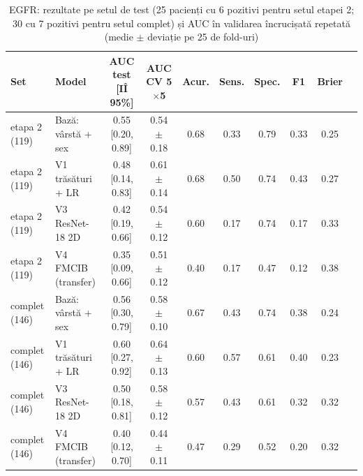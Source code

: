 \begin{table}[htbp]
\centering
\scriptsize
\setlength{\tabcolsep}{3pt}
\begin{tabular}{llcccccccc}
\toprule
\textbf{Set} & \textbf{Model} & \textbf{AUC test [IÎ 95\%]} & \textbf{AUC CV 5$\times$5} & \textbf{Acur.} & \textbf{Sens.} & \textbf{Spec.} & \textbf{F1} & \textbf{Brier} \\
\midrule
etapa 2 (119) & Bază: vârstă + sex & 0.55 [0.20, 0.89] & 0.54 $\pm$ 0.18 & 0.68 & 0.33 & 0.79 & 0.33 & 0.25 \\
etapa 2 (119) & V1 trăsături + LR & 0.48 [0.14, 0.83] & 0.61 $\pm$ 0.14 & 0.68 & 0.50 & 0.74 & 0.43 & 0.27 \\
etapa 2 (119) & V3 ResNet-18 2D & 0.42 [0.19, 0.66] & 0.54 $\pm$ 0.12 & 0.60 & 0.17 & 0.74 & 0.17 & 0.33 \\
etapa 2 (119) & V4 FMCIB (transfer) & 0.35 [0.09, 0.66] & 0.51 $\pm$ 0.12 & 0.40 & 0.17 & 0.47 & 0.12 & 0.38 \\
\midrule
complet (146) & Bază: vârstă + sex & 0.56 [0.30, 0.79] & 0.58 $\pm$ 0.10 & 0.67 & 0.43 & 0.74 & 0.38 & 0.24 \\
complet (146) & V1 trăsături + LR & 0.60 [0.27, 0.92] & 0.64 $\pm$ 0.13 & 0.60 & 0.57 & 0.61 & 0.40 & 0.23 \\
complet (146) & V3 ResNet-18 2D & 0.50 [0.18, 0.81] & 0.58 $\pm$ 0.12 & 0.57 & 0.43 & 0.61 & 0.32 & 0.32 \\
complet (146) & V4 FMCIB (transfer) & 0.40 [0.12, 0.70] & 0.44 $\pm$ 0.11 & 0.47 & 0.29 & 0.52 & 0.20 & 0.32 \\
\bottomrule
\end{tabular}
\caption{EGFR: rezultate pe setul de test (25 pacienți cu 6 pozitivi pentru setul etapei 2; 30 cu 7 pozitivi pentru setul complet) și AUC în validarea încrucișată repetată (medie $\pm$ deviație pe 25 de fold-uri)}
\label{tab:s3_egfr}
\end{table}

